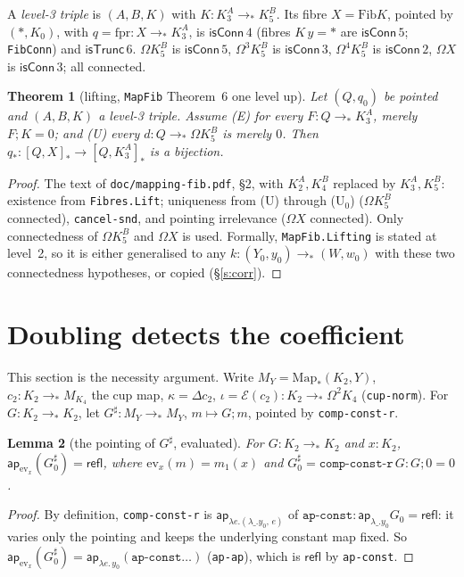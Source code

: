 \documentclass[11pt]{amsart}
\newtheorem{theorem}{Theorem}
\newtheorem{lemma}[theorem]{Lemma}
\theoremstyle{definition}
\theoremstyle{remark}
\newcommand{\Om}{\Omega}
\newcommand{\Map}{\mathrm{Map}_*}
\newcommand{\code}[1]{\texttt{#1}}
\newcommand{\cT}{\mathsf{isTrunc}}
\newcommand{\cC}{\mathsf{isConn}}
\newcommand{\refl}{\mathsf{refl}}
\newcommand{\ap}{\mathsf{ap}}
\newcommand{\hc}[2]{[#1,#2]_*}
\newcommand{\Fib}{\mathrm{Fib}}
\newcommand{\cE}{\mathcal E}
\begin{document}
A \emph{level-3 triple} is $(A,B,K)$ with $K:K^A_3\to_*K^B_5$. Its fibre
$X=\Fib K$, pointed by $(*,K_0)$, with $q=\mathrm{fpr}:X\to_*K^A_3$, is
$\cC\,4$ (fibres $K\,y=*$ are $\cC\,5$; \code{FibConn}) and $\cT\,6$.
$\Om K^B_5$ is $\cC\,5$, $\Om^3K^B_5$ is $\cC\,3$, $\Om^4K^B_5$ is $\cC\,2$,
$\Om X$ is $\cC\,3$; all connected.

\begin{theorem}[lifting, \code{MapFib} Theorem~6 one level up]\label{t:lift}
Let $(Q,q_0)$ be pointed and $(A,B,K)$ a level-3 triple. Assume
(E) for every $F:Q\to_*K^A_3$, merely $F;K=0$; and (U) every $d:Q\to_*\Om K^B_5$
is merely $0$. Then $q_*:\hc QX\to\hc Q{K^A_3}$ is a bijection.
\end{theorem}
\begin{proof}
The text of \code{doc/mapping-fib.pdf}, \S2, with $K^A_2,K^B_4$ replaced by
$K^A_3,K^B_5$: existence from \code{Fibres.Lift}; uniqueness from (U) through
(U$_0$) ($\Om K^B_5$ connected), \code{cancel-snd}, and pointing irrelevance
($\Om X$ connected). Only connectedness of $\Om K^B_5$ and $\Om X$ is used.
Formally, \code{MapFib.Lifting} is stated at level~2, so it is either
generalised to any $k:(Y_0,y_0)\to_*(W,w_0)$ with these two connectedness
hypotheses, or copied (\S\ref{s:corr}).
\end{proof}

\section{Doubling detects the coefficient}\label{s:N}

This section is the necessity argument. Write $M_Y=\Map(K_2,Y)$, $c_2:K_2\to_*M_{K_4}$
the cup map, $\kappa=\Delta c_2$, $\iota=\cE(c_2):K_2\to_*\Om^2K_4$
(\code{cup-norm}). For $G:K_2\to_*K_2$, let $G^\sharp:M_Y\to_*M_Y$,
$m\mapsto G;m$, pointed by \code{comp-const-r}.

\begin{lemma}[the pointing of $G^\sharp$, evaluated]\label{l:ccr}
For $G:K_2\to_*K_2$ and $x:K_2$, $\ap_{\mathrm{ev}_x}(G^\sharp_0)=\refl$, where
$\mathrm{ev}_x(m)=m_1(x)$ and $G^\sharp_0=\code{comp-const-r}\,G:G;0=0$.
\end{lemma}
\begin{proof}
By definition, \code{comp-const-r} is $\ap_{\lambda e.(\lambda\_.y_0,\,e)}$ of
$\code{ap-const}:\ap_{\lambda\_.y_0}G_0=\refl$: it varies only the pointing and keeps
the underlying constant map fixed. So $\ap_{\mathrm{ev}_x}(G^\sharp_0)=
\ap_{\lambda e.\,y_0}(\code{ap-const}\ldots)$ (\code{ap-ap}), which is $\refl$ by
\code{ap-const}.
\end{proof}
\end{document}
